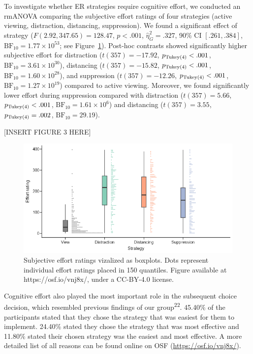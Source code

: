 \documentclass[
  man,floatsintext]{apa6}
\begin{document}
To investigate whether ER strategies require cognitive effort, we conducted an rmANOVA comparing the subjective effort ratings of four strategies (active viewing, distraction, distancing, suppression).
We found a significant effect of strategy (\(F(2.92, 347.65) = 128.47\), \(p < .001\), \(\hat{\eta}^2_G = .327\), 90\% CI \([.261, .384]\), \(\mathrm{BF}_{\textrm{10}} = 1.77 \times 10^{53}\); see Figure~\ref{fig:FigSubjEffort}).
Post-hoc contrasts showed significantly higher subjective effort for distraction (\(t(357) = -17.92\), \(p_\mathrm{\scriptsize Tukey(4)} < .001\), \(\mathrm{BF}_{\textrm{10}} = 3.61 \times 10^{30}\)), distancing (\(t(357) = -15.82\), \(p_\mathrm{\scriptsize Tukey(4)} < .001\), \(\mathrm{BF}_{\textrm{10}} = 1.60 \times 10^{28}\)), and suppression (\(t(357) = -12.26\), \(p_\mathrm{\scriptsize Tukey(4)} < .001\), \(\mathrm{BF}_{\textrm{10}} = 1.27 \times 10^{19}\)) compared to active viewing.
Moreover, we found significantly lower effort during suppression compared with distraction (\(t(357) = 5.66\), \(p_\mathrm{\scriptsize Tukey(4)} < .001\), \(\mathrm{BF}_{\textrm{10}} = 1.61 \times 10^{6}\)) and distancing (\(t(357) = 3.55\), \(p_\mathrm{\scriptsize Tukey(4)} = .002\), \(\mathrm{BF}_{\textrm{10}} = 29.19\)).

{[}INSERT FIGURE 3 HERE{]}

\begin{figure}[H]
\includegraphics[width=\textwidth]{figures/FigSubjEffort} \caption{Subjective effort ratings vizalized as boxplots. Dots represent individual effort ratings placed in 150 quantiles. Figure available at https://osf.io/vnj8x/, under a CC-BY-4.0 license.}\label{fig:FigSubjEffort}
\end{figure}

Cognitive effort also played the most important role in the subsequent choice decision, which resembled previous findings of our group\textsuperscript{22}.
45.40\% of the participants stated that they chose the strategy that was easiest for them to implement.
24.40\% stated they chose the strategy that was most effective and 11.80\% stated their chosen strategy was the easiest and most effective.
A more detailed list of all reasons can be found online on OSF (\url{https://osf.io/vnj8x/}).
\end{document}
